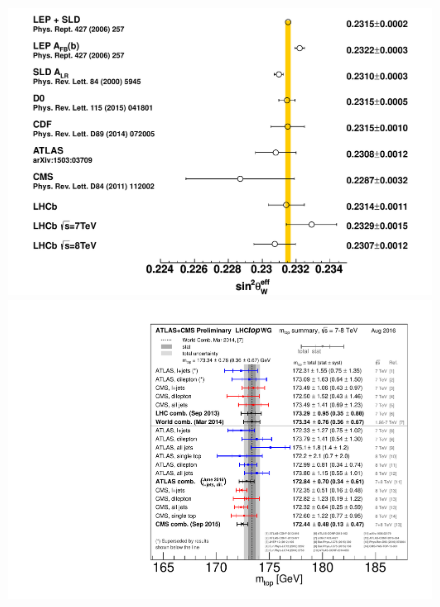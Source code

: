 \documentclass{blois}
\begin{document}
\begin{figure}
\begin{minipage}{0.40\linewidth}
\centerline{\includegraphics[width=1.00\linewidth]{figures/stw_comp_fullref_final}}
\end{minipage}
\begin{minipage}{0.33\linewidth}
\centerline{\includegraphics[width=1.00\linewidth]{figures/LHC_topmass_aug2016}}
\end{minipage}
\begin{minipage}{0.25\linewidth}

\end{minipage}
\end{figure}
\end{document}

